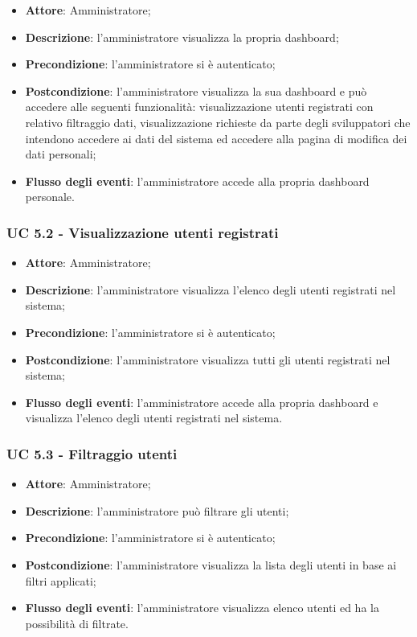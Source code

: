 \begin{itemize}
\item \textbf{Attore}: Amministratore; 
\item \textbf{Descrizione}: l'amministratore visualizza la propria dashboard;
\item \textbf{Precondizione}: l'amministratore si è autenticato;
\item \textbf{Postcondizione}: l'amministratore visualizza la sua dashboard e può accedere alle seguenti funzionalità: visualizzazione utenti registrati con relativo filtraggio dati, visualizzazione richieste da parte degli sviluppatori che intendono accedere ai dati del sistema ed accedere alla pagina di modifica dei dati personali;
\item \textbf{Flusso degli eventi}: l'amministratore accede alla propria dashboard personale.
\end{itemize}

\subsubsection{UC 5.2 - Visualizzazione utenti registrati}

\begin{itemize}
\item \textbf{Attore}: Amministratore;
\item \textbf{Descrizione}: l'amministratore visualizza l'elenco degli utenti registrati nel sistema;
\item \textbf{Precondizione}: l'amministratore si è autenticato;
\item \textbf{Postcondizione}: l'amministratore visualizza tutti gli utenti registrati nel sistema;
\item \textbf{Flusso degli eventi}: l'amministratore accede alla propria dashboard e visualizza l'elenco degli utenti registrati nel sistema.
\end{itemize}

\subsubsection{UC 5.3 - Filtraggio utenti}
\begin{itemize}
\item \textbf{Attore}: Amministratore;
\item \textbf{Descrizione}: l'amministratore può filtrare gli utenti;
\item \textbf{Precondizione}: l'amministratore si è autenticato;
\item \textbf{Postcondizione}: l'amministratore visualizza la lista degli utenti in base ai filtri applicati;
\item \textbf{Flusso degli eventi}: l'amministratore visualizza elenco utenti ed ha la possibilità di filtrate.
\end{itemize}
